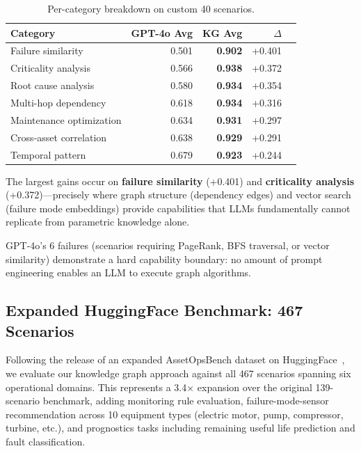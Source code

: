 \documentclass[11pt]{article}
\begin{document}
\begin{table}[t]
  \centering
  \caption{Per-category breakdown on custom 40 scenarios.}
  \label{tab:custom-categories-detail}
  \begin{tabular}{@{}lrrrr@{}}
    \toprule
    \textbf{Category} & \textbf{GPT-4o Avg} & \textbf{KG Avg} & \textbf{$\Delta$} \\
    \midrule
    Failure similarity       & 0.501 & \textbf{0.902} & +0.401 \\
    Criticality analysis     & 0.566 & \textbf{0.938} & +0.372 \\
    Root cause analysis      & 0.580 & \textbf{0.934} & +0.354 \\
    Multi-hop dependency     & 0.618 & \textbf{0.934} & +0.316 \\
    Maintenance optimization & 0.634 & \textbf{0.931} & +0.297 \\
    Cross-asset correlation  & 0.638 & \textbf{0.929} & +0.291 \\
    Temporal pattern         & 0.679 & \textbf{0.923} & +0.244 \\
    \bottomrule
  \end{tabular}
\end{table}

The largest gains occur on \textbf{failure similarity} (+0.401) and \textbf{criticality analysis} (+0.372)---precisely where graph structure (dependency edges) and vector search (failure mode embeddings) provide capabilities that LLMs fundamentally cannot replicate from parametric knowledge alone.

GPT-4o's 6 failures (scenarios requiring PageRank, BFS traversal, or vector similarity) demonstrate a hard capability boundary: no amount of prompt engineering enables an LLM to execute graph algorithms.

\subsection{Expanded HuggingFace Benchmark: 467 Scenarios}
\label{sec:hf-expanded}

Following the release of an expanded AssetOpsBench dataset on HuggingFace~\citep{ibm2025assetopsbench}, we evaluate our knowledge graph approach against all 467 scenarios spanning six operational domains. This represents a 3.4$\times$ expansion over the original 139-scenario benchmark, adding monitoring rule evaluation, failure-mode-sensor recommendation across 10 equipment types (electric motor, pump, compressor, turbine, etc.), and prognostics tasks including remaining useful life prediction and fault classification.
\end{document}
